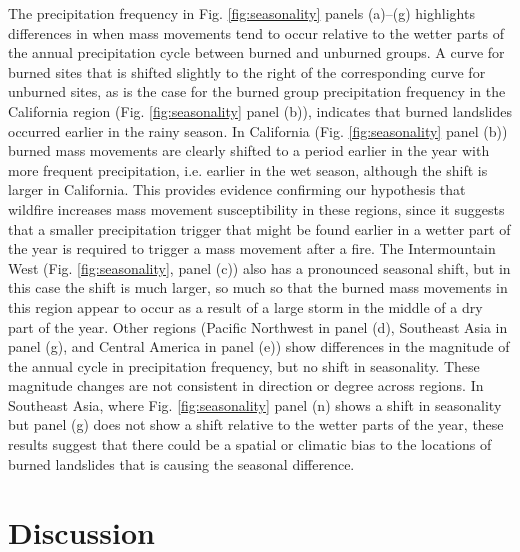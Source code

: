 \documentclass[nhess, manuscript]{copernicus}
\begin{document}
The precipitation frequency in Fig. \ref{fig:seasonality}
panels (a)--(g) highlights differences in when mass movements tend to occur
relative to the wetter parts of the annual precipitation cycle between
burned and unburned groups. A curve for burned sites that is shifted
slightly to the right of the corresponding curve for unburned sites, as
is the case for the burned group precipitation frequency in the
California region (Fig. \ref{fig:seasonality} panel (b)),
indicates that burned landslides occurred earlier in the rainy
season. In California 
(Fig. \ref{fig:seasonality} panel (b)) burned mass movements are clearly
shifted to a period earlier in the year with more frequent precipitation,
i.e. earlier in the wet season, although the shift is larger in
California. This provides evidence confirming our hypothesis that wildfire increases mass movement susceptibility in these regions, since it suggests that a smaller precipitation trigger that might be found earlier in a wetter part of the year is required to trigger a mass movement after a fire. The Intermountain West
(Fig. \ref{fig:seasonality}, panel (c)) also has a pronounced
seasonal shift, but in this case the shift is much larger, so much so
that the burned mass movements in this region appear to occur as a result of
a large storm in the middle of a dry part of the year. Other regions
(Pacific Northwest in panel (d), Southeast Asia in panel (g), and Central
America in panel (e)) show differences in the magnitude of the annual
cycle in precipitation frequency, but no shift in seasonality. These
magnitude changes are not consistent in direction or degree across
regions. In Southeast Asia, where Fig. \ref{fig:seasonality}
panel (n) shows a shift in seasonality but panel (g) does not show a shift
relative to the wetter parts of the year, these results suggest that
there could be a spatial or climatic bias to the locations of burned
landslides that is causing the seasonal difference.


\section{Discussion}\label{discussion}
\end{document}
